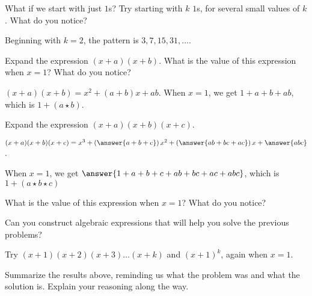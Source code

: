 \documentclass{ximera}
\begin{document}
\begin{problem}
What if we start with just $1$s?  Try starting with $k$ $1$s, for several small values of $k$.  What do you notice?  
\begin{freeResponse}
Beginning with $k=2$, the pattern is $3, 7, 15, 31, \dots$.  
\end{freeResponse}
\vfill
\end{problem}

\newpage 

\begin{problem}
Expand the expression $(x+a)(x+b)$.  What is the value of this expression when $x=1$?  What do you notice?
\begin{freeResponse}
$(x+a)(x+b) = x^2+ (a+b)x+ab$.  When $x=1$, we get $1+a+b+ab$, which is $1+(a\star b)$.  
\end{freeResponse}
\vfill
\end{problem}

\begin{problem}
Expand the expression $(x+a)(x+b)(x+c)$.  
\begin{prompt}
$(x+a)(x+b)(x+c) = x^3+ \left(\answer{a+b+c}\right)x^2+\left(\answer{ab+bc+ac}\right)x+\answer{abc}$.  
\end{prompt}

When $x=1$, we get $\answer{1+a+b+c+ab+bc+ac+abc}$, which is $1+(a\star b\star c)$

What is the value of this expression when $x=1$?  What do you notice?
\vfill
\end{problem}

\newpage 

\begin{problem}
Can you construct algebraic expressions that will help you solve the previous problems?  
\begin{freeResponse}
Try $(x+1)(x+2)(x+3)\dots(x+k)$ and $(x+1)^k$, again when $x=1$.  
\end{freeResponse}
\vfill
\end{problem}

\begin{problem}
Summarize the results above, reminding us what the problem was and
what the solution is. Explain your reasoning along the way.
\begin{freeResponse}
\end{freeResponse}
\vfill
\end{problem}
\end{document}
